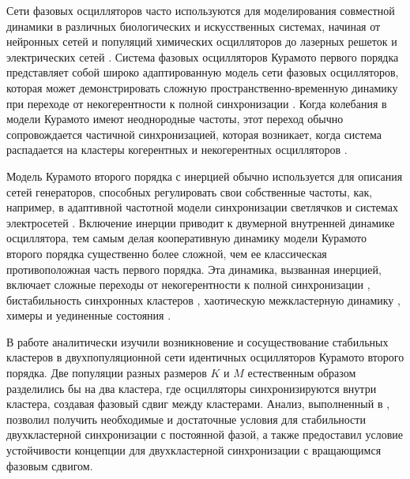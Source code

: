 Сети фазовых осцилляторов часто используются для моделирования
совместной динамики в различных биологических и
искусственных системах, начиная от нейронных сетей \cite{Hoppensteadt:Izhikevich} и
популяций химических осцилляторов \cite{Tinsley:Nkomo} до лазерных решеток \cite{Ding:Belykh}
и электрических сетей \cite{Dorfler:Chertkov}. Система
фазовых осцилляторов Курамото первого порядка \cite{Kuramoto,Strogatz} представляет собой широко адаптированную модель
сети фазовых осцилляторов, которая может демонстрировать сложную
пространственно-временную динамику при переходе от
некогерентности к полной синхронизации \cite{Acebron:Bonilla,Barreto:Hunt,Ott:Antonsen,Hong:Chate,Pikovsky:Rosenblum,Maistrenko:Popovych,Dorfler:Bullo,Martens:Barreto}.
Когда колебания в модели Курамото имеют неоднородные частоты, этот переход обычно
сопровождается частичной синхронизацией, которая возникает, когда система
распадается на кластеры когерентных и некогерентных осцилляторов
\cite{Acebron:Bonilla,Martens:Barreto,Laing}.

Модель Курамото второго порядка с инерцией обычно используется для описания сетей генераторов,
способных регулировать свои собственные частоты, как, например, в адаптивной частотной
модели синхронизации светлячков \cite{Ermentrout} и системах электросетей \cite{Tumash}.
Включение инерции приводит к двумерной внутренней динамике осциллятора,
тем самым делая кооперативную динамику модели Курамото второго порядка существенно более
сложной, чем ее классическая противоположная часть первого порядка.
Эта динамика, вызванная инерцией, включает сложные переходы от некогерентности
к полной синхронизации \cite{Tanaka:Review,Tanaka:Physica,Peron,Munyaev:Smirnov,Komarov:Gupta,Olmi:Navas,Barabash:Belykh},
бистабильность синхронных кластеров \cite{Belykh:Brister}, хаотическую межкластерную динамику \cite{Brister:Belykh},
химеры \cite{Olmi:Chaos, Maistrenko:Brezetsky, Medvedev:Mizuhara} и уединенные состояния \cite{Jaros:Maistrenko, Jaros:Brezetsky}.

В работе \cite{Belykh:Brister} аналитически изучили возникновение и сосуществование стабильных
кластеров в двухпопуляционной сети идентичных осцилляторов Курамото второго порядка.
Две популяции разных размеров $K$ и $M$ естественным образом разделились бы на два кластера,
где осцилляторы синхронизируются внутри кластера, создавая фазовый сдвиг между кластерами.
Анализ, выполненный в \cite{Belykh:Brister}, позволил получить необходимые и достаточные условия для стабильности
двухкластерной синхронизации с постоянной фазой, а
также предоставил условие устойчивости концепции для двухкластерной синхронизации с
вращающимся фазовым сдвигом. 


